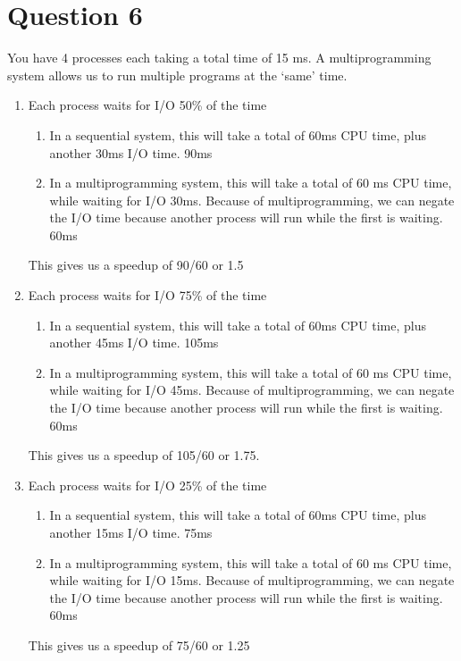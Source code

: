 \documentclass[12pt]{extarticle}
\begin{document}
	\section*{Question 6}
		You have 4 processes each taking a total time of 15 ms.  A multiprogramming system allows us to run multiple programs at the `same' time.  
		\begin{enumerate}
			\item Each process waits for I/O 50\% of the time
				\begin{enumerate}
					\item In a sequential system, this will take a total of 60ms CPU time, plus another 30ms I/O time.  90ms
					\item In a multiprogramming system, this will take a total of 60 ms CPU time, while waiting for I/O 30ms.  Because of multiprogramming, we can negate the I/O time because another process will run while the first is waiting. 60ms
				\end{enumerate}
				This gives us a speedup of 90/60 or 1.5
			\item Each process waits for I/O 75\% of the time
				\begin{enumerate}
					\item In a sequential system, this will take a total of 60ms CPU time, plus another 45ms I/O time. 105ms
					\item In a multiprogramming system, this will take a total of 60 ms CPU time, while waiting for I/O 45ms.  Because of multiprogramming, we can negate the I/O time because another process will run while the first is waiting. 60ms
				\end{enumerate}
				This gives us a speedup of 105/60 or 1.75.
			\item Each process waits for I/O 25\% of the time
				\begin{enumerate}
					\item In a sequential system, this will take a total of 60ms CPU time, plus another 15ms I/O time. 75ms
					\item In a multiprogramming system, this will take a total of 60 ms CPU time, while waiting for I/O 15ms.  Because of multiprogramming, we can negate the I/O time because another process will run while the first is waiting. 60ms
				\end{enumerate}
				This gives us a speedup of 75/60 or 1.25\\

\end{enumerate}
\end{document}
